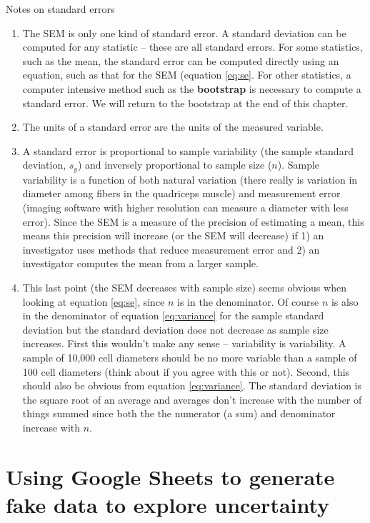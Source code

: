 \documentclass[]{book}
\providecommand{\tightlist}{%
  \setlength{\itemsep}{0pt}\setlength{\parskip}{0pt}}
\begin{document}
Notes on standard errors

\begin{enumerate}
\def\labelenumi{\arabic{enumi}.}
\tightlist
\item
  The SEM is only one kind of standard error. A standard deviation can
  be computed for any statistic -- these are all standard errors. For
  some statistics, such as the mean, the standard error can be computed
  directly using an equation, such as that for the SEM (equation
  \eqref{eq:se}. For other statistics, a computer intensive method such as
  the \textbf{bootstrap} is necessary to compute a standard error. We
  will return to the bootstrap at the end of this chapter.
\item
  The units of a standard error are the units of the measured variable.
\item
  A standard error is proportional to sample variability (the sample
  standard deviation, \(s_y\)) and inversely proportional to sample size
  (\(n\)). Sample variability is a function of both natural variation
  (there really is variation in diameter among fibers in the quadriceps
  muscle) and measurement error (imaging software with higher resolution
  can measure a diameter with less error). Since the SEM is a measure of
  the precision of estimating a mean, this means this precision will
  increase (or the SEM will decrease) if 1) an investigator uses methods
  that reduce measurement error and 2) an investigator computes the mean
  from a larger sample.
\item
  This last point (the SEM decreases with sample size) seems obvious
  when looking at equation \eqref{eq:se}, since \(n\) is in the
  denominator. Of course \(n\) is also in the denominator of equation
  \eqref{eq:variance} for the sample standard deviation but the standard
  deviation does not decrease as sample size increases. First this
  wouldn't make any sense -- variability is variability. A sample of
  10,000 cell diameters should be no more variable than a sample of 100
  cell diameters (think about if you agree with this or not). Second,
  this should also be obvious from equation \eqref{eq:variance}. The
  standard deviation is the square root of an average and averages don't
  increase with the number of things summed since both the the numerator
  (a sum) and denominator increase with \(n\).
\end{enumerate}

\section{Using Google Sheets to generate fake data to explore
uncertainty}\label{using-google-sheets-to-generate-fake-data-to-explore-uncertainty}
\end{document}

